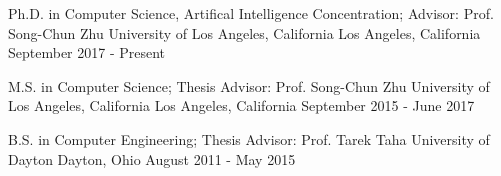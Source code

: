 


\begin{cventries}


\cventry
{Ph.D. in Computer Science, Artifical Intelligence Concentration; Advisor: Prof. Song-Chun Zhu}
{University of Los Angeles, California} %
{Los Angeles, California} %
{September 2017 - Present} %
{ %
}
\vspace{-3mm}


\cventry
{M.S. in Computer Science; Thesis Advisor: Prof. Song-Chun Zhu}
{University of Los Angeles, California} %
{Los Angeles, California} %
{September 2015 - June 2017} %
{ %
}
\vspace{-3mm}


\cventry
{B.S. in Computer Engineering; Thesis Advisor: Prof. Tarek Taha}
{University of Dayton} %
{Dayton, Ohio} %
{August 2011 - May 2015} %
{ %
}
\vspace{-5.5mm}


\end{cventries}